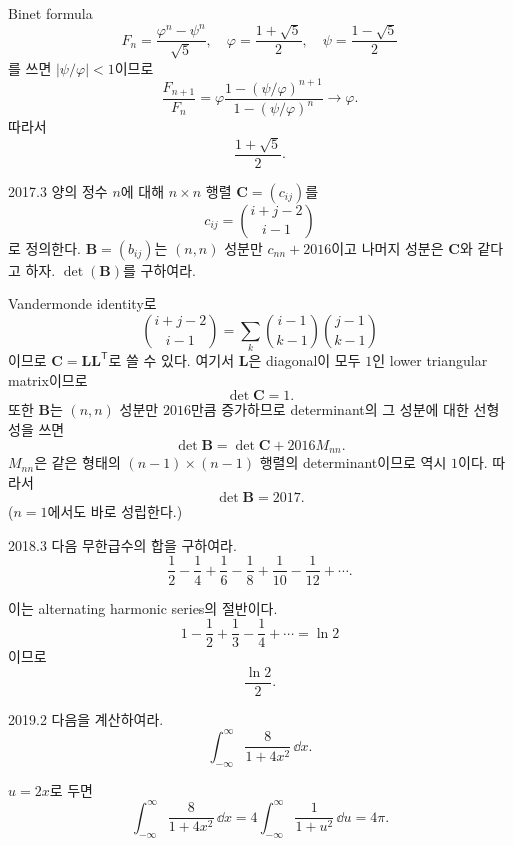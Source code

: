 \begin{solution}
Binet formula
\[
F_n=\frac{\varphi^n-\psi^n}{\sqrt5},
\quad
\varphi=\frac{1+\sqrt5}{2},\quad
\psi=\frac{1-\sqrt5}{2}
\]
를 쓰면 $|\psi/\varphi|<1$이므로
\[
\frac{F_{n+1}}{F_n}
=\varphi\frac{1-(\psi/\varphi)^{n+1}}{1-(\psi/\varphi)^n}
\longrightarrow\varphi.
\]
따라서
\[
\boxed{\frac{1+\sqrt5}{2}}.
\]
\end{solution}

\begin{pastproblem}{2017.3}
양의 정수 $n$에 대해 $n\times n$ 행렬 $\mathbf C=(c_{ij})$를
\[
c_{ij}=\binom{i+j-2}{i-1}
\]
로 정의한다. $\mathbf B=(b_{ij})$는 $(n,n)$ 성분만 $c_{nn}+2016$이고 나머지 성분은 $\mathbf C$와 같다고 하자. $\det(\mathbf B)$를 구하여라.
\end{pastproblem}

\begin{solution}
Vandermonde identity로
\[
\binom{i+j-2}{i-1}
=\sum_k\binom{i-1}{k-1}\binom{j-1}{k-1}
\]
이므로 $\mathbf C=\mathbf L\mathbf L^{\mathsf T}$로 쓸 수 있다. 여기서 $\mathbf L$은 diagonal이 모두 $1$인 lower triangular matrix이므로
\[
\det\mathbf C=1.
\]
또한 $\mathbf B$는 $(n,n)$ 성분만 $2016$만큼 증가하므로 determinant의 그 성분에 대한 선형성을 쓰면
\[
\det\mathbf B=\det\mathbf C+2016M_{nn}.
\]
$M_{nn}$은 같은 형태의 $(n-1)\times(n-1)$ 행렬의 determinant이므로 역시 $1$이다. 따라서
\[
\boxed{\det\mathbf B=2017}.
\]
($n=1$에서도 바로 성립한다.)
\end{solution}

\begin{pastproblem}{2018.3}
다음 무한급수의 합을 구하여라.
\[
\frac12-\frac14+\frac16-\frac18+\frac1{10}-\frac1{12}+\cdots.
\]
\end{pastproblem}

\begin{solution}
이는 alternating harmonic series의 절반이다.
\[
1-\frac12+\frac13-\frac14+\cdots=\ln2
\]
이므로
\[
\boxed{\frac{\ln2}{2}}.
\]
\end{solution}

\begin{pastproblem}{2019.2}
다음을 계산하여라.
\[
\int_{-\infty}^{\infty}\frac{8}{1+4x^2}\,\dd x.
\]
\end{pastproblem}

\begin{solution}
$u=2x$로 두면
\[
\int_{-\infty}^{\infty}\frac{8}{1+4x^2}\,\dd x
=4\int_{-\infty}^{\infty}\frac{1}{1+u^2}\,\dd u
=\boxed{4\pi}.
\]
\end{solution}

